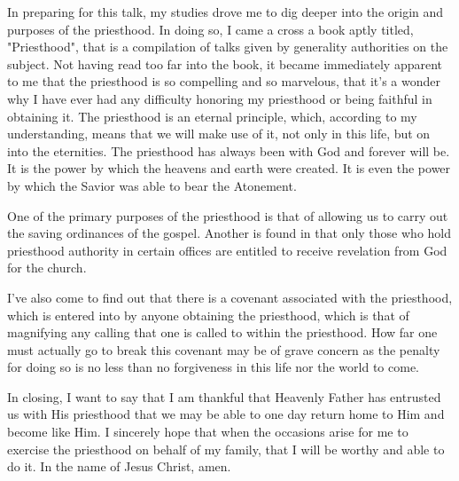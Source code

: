 \documentclass[12pt]{article}
\begin{document}
In preparing for this talk, my studies drove me to dig deeper into the origin and
purposes of the priesthood. In doing so, I came a cross a book aptly titled, "Priesthood",
that is a compilation of talks given by generality authorities on the subject.
Not having read too far into the book, it became immediately apparent to me that
the priesthood is so compelling and so marvelous, that it's a wonder why I have ever had any difficulty
honoring my priesthood or being faithful in obtaining it.  The priesthood is an
eternal principle, which, according to my understanding, means that we will make
use of it, not only in this life, but on into the eternities.  The priesthood has always been with God
and forever will be.  It is the power by which the heavens and earth were created.
It is even the power by which the Savior was able to bear the Atonement.

One of the primary purposes of the priesthood is that of allowing us to carry out
the saving ordinances of the gospel.  Another is found in that only those who
hold priesthood authority in certain offices are entitled to receive revelation from
God for the church.

I've also come to find out that there is a covenant associated with the priesthood,
which is entered into by anyone obtaining the priesthood,
which is that of magnifying any calling that one is called to within the priesthood.
How far one must actually go to break this covenant may be of grave concern as
the penalty for doing so is no less than no forgiveness in this life nor the world to come.

In closing, I want to say that I am thankful that Heavenly Father has entrusted
us with His priesthood that we may be able to one day return home to Him and become
like Him.  I sincerely hope that when the occasions arise for me to exercise the
priesthood on behalf of my family, that I will be worthy and able to do it.
In the name of Jesus Christ, amen.
\end{document}
